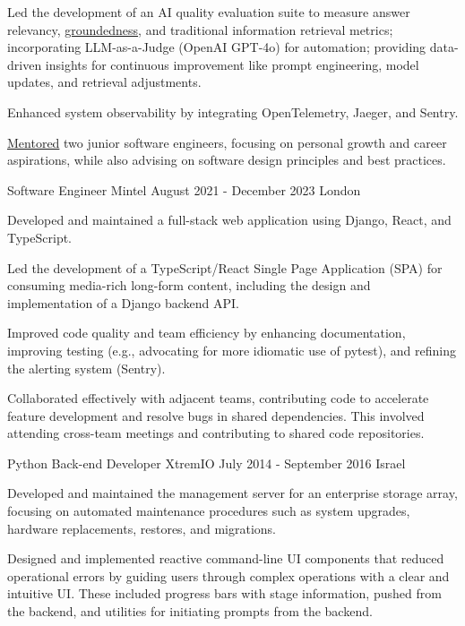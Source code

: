 \documentclass[11pt, a4paper]{awesome-cv}
\begin{document}
\begin{cventries}
{\begin{cvitems}
        \item {Led the development of an AI quality evaluation suite to measure answer relevancy, \href{https://leverstone.me/blog/automating-groundedness-evaluation-in-rag-applications}{groundedness}, and traditional information retrieval metrics; incorporating LLM-as-a-Judge (OpenAI GPT-4o) for automation; providing data-driven insights for continuous improvement like prompt engineering, model updates, and retrieval adjustments.}
        \item {Enhanced system observability by integrating OpenTelemetry, Jaeger, and Sentry.}
        \item {\href{https://leverstone.me/blog/mentoring-toolkit}{Mentored} two junior software engineers, focusing on personal growth and career aspirations, while also advising on software design principles and best practices.}
      \end{cvitems}
    }

  \cventry
    {Software Engineer}
    {Mintel}
    {August 2021 - December 2023}
    {London}
    {
      \begin{cvitems}
        \item {Developed and maintained a full-stack web application using Django, React, and TypeScript.}
        \item {Led the development of a TypeScript/React Single Page Application (SPA) for consuming media-rich long-form content, including the design and implementation of a Django backend API.}
        \item {Improved code quality and team efficiency by enhancing documentation, improving testing (e.g., advocating for more idiomatic use of pytest), and refining the alerting system (Sentry).}
        \item {Collaborated effectively with adjacent teams, contributing code to accelerate feature development and resolve bugs in shared dependencies. This involved attending cross-team meetings and contributing to shared code repositories.}
      \end{cvitems}
    }

  \cventry
    {Python Back-end Developer}
    {XtremIO}
    {July 2014 - September 2016}
    {Israel}
    {
      \begin{cvitems}
        \item {Developed and maintained the management server for an enterprise storage array, focusing on automated maintenance procedures such as system upgrades, hardware replacements, restores, and migrations.}
        \item {Designed and implemented reactive command-line UI components that reduced operational errors by guiding users through complex operations with a clear and intuitive UI. These included progress bars with stage information, pushed from the backend, and utilities for initiating prompts from the backend.}
      \end{cvitems}
    }

\end{cventries}
\end{document}
